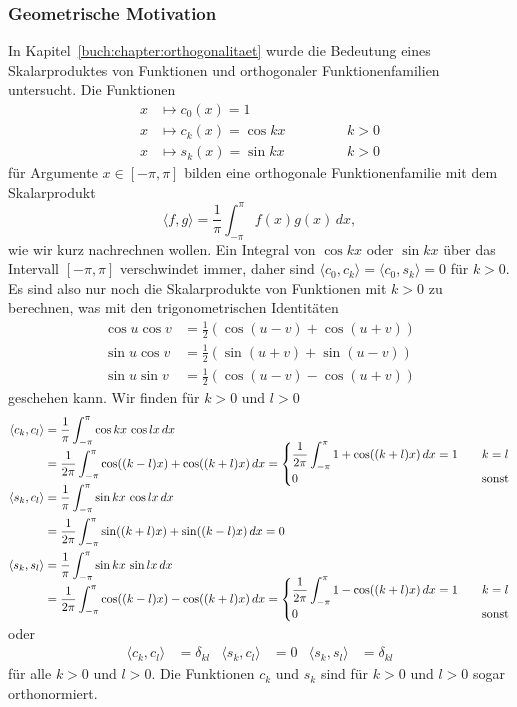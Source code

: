 \subsubsection{Geometrische Motivation}
In Kapitel~\ref{buch:chapter:orthogonalitaet} wurde die Bedeutung
eines Skalarproduktes von Funktionen und orthogonaler Funktionenfamilien
untersucht.
Die Funktionen
\[
\begin{aligned}
x&\mapsto c_0(x)=1&&&\\
x&\mapsto c_k(x)=\cos kx&&\qquad&k> 0\\
x&\mapsto s_k(x)=\sin kx&&\qquad&k> 0
\end{aligned}
\]
für Argumente $x\in[-\pi,\pi]$
bilden eine orthogonale Funktionenfamilie mit dem Skalarprodukt
\[
\langle f,g\rangle
=
\frac{1}{\pi}
\int_{-\pi}^\pi f(x)g(x)\,dx,
\]
wie wir kurz nachrechnen wollen.
Ein Integral von $\cos kx$ oder $\sin kx$ über das Intervall $[-\pi,\pi]$
verschwindet immer, daher sind
$\langle c_0,c_k\rangle=\langle c_0,s_k\rangle=0$
für $k>0$.
Es sind also nur noch die Skalarprodukte von Funktionen mit $k>0$ zu 
berechnen, was mit den trigonometrischen Identitäten
\begin{align*}
\cos u\cos v &=\frac12(\cos(u-v)+\cos(u+v))
\\
\sin u\cos v &=\frac12(\sin(u+v)+\sin(u-v))
\\
\sin u\sin v &=\frac12(\cos(u-v)-\cos(u+v))
\end{align*}
geschehen kann.
Wir finden für $k>0$ und $l>0$
\begin{align*}
\langle c_k,c_l\rangle
&=
\frac1\pi\int_{-\pi}^\pi
\cos kx\,\cos lx
\,dx
\\
&=
\frac1{2\pi}\int_{-\pi}^\pi
\cos((k-l)x) + \cos((k+l)x)
\,dx
=
\smash{
\begin{cases}
\displaystyle \frac1{2\pi}\int_{-\pi}^\pi 1 + \cos((k+l)x)\,dx = 1&\quad k=l\\
0&\quad\text{sonst}
\end{cases}
}
\\
\langle s_k,c_l\rangle
&=
\frac1\pi\int_{-\pi}^\pi
\sin kx\,\cos lx
\,dx
\\
&=
\frac1{2\pi}\int_{-\pi}^\pi
\sin((k+l)x)+\sin((k-l)x)
\,dx
=0
\\
\langle s_k,s_l\rangle
&=
\frac1\pi\int_{-\pi}^\pi
\sin kx\,\sin lx
\,dx
\\
&=
\frac1{2\pi}\int_{-\pi}^\pi
\cos((k-l)x)-\cos((k+l)x)
\,dx
=
\smash{
\begin{cases}
\displaystyle \frac1{2\pi}\int_{-\pi}^\pi 1 - \cos((k+l)x)\,dx = 1&\quad k=l\\
0&\quad\text{sonst}
\end{cases}
}
\end{align*}
oder
\begin{align*}
\langle c_k,c_l\rangle &= \delta_{kl} &
\langle s_k,c_l\rangle &= 0           &
\langle s_k,s_l\rangle &= \delta_{kl}
\end{align*}
für alle $k>0$ und $l>0$.
Die Funktionen $c_k$ und $s_k$ sind für $k>0$ und $l>0$ sogar 
orthonormiert.


